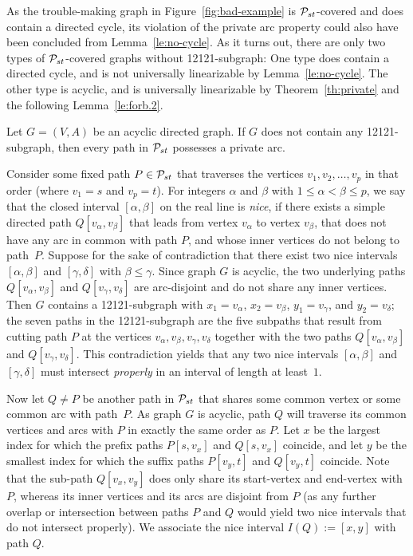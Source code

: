 As the trouble-making graph in Figure~\ref{fig:bad-example} is ${\cal P}_{st}$-covered and 
does contain a directed cycle, its violation of the private arc property could also have 
been concluded from Lemma~\ref{le:no-cycle}.
As it turns out, there are only two types of ${\cal P}_{st}$-covered graphs without 12121-subgraph:
One type does contain a directed cycle, and is not universally linearizable by Lemma~\ref{le:no-cycle}.
The other type is acyclic, and is universally linearizable by Theorem~\ref{th:private} and 
the following Lemma~\ref{le:forb.2}.
\begin{lemma}
\label{le:forb.2}
Let $G=(V,A)$ be an acyclic directed graph.
If $G$ does not contain any 12121-subgraph,
then every path in ${\cal P}_{st}$ possesses a private arc.
\end{lemma}
\proof
Consider some fixed path $P\in{\cal P}_{st}$ that traverses the vertices $v_1,v_2,\ldots,v_p$ in 
that order (where $v_1=s$ and $v_p=t$).
For integers $\alpha$ and $\beta$ with $1\le\alpha<\beta\le p$, we say that the closed interval 
$[\alpha,\beta]$ on the real line is \emph{nice}, if there exists a simple directed path 
$Q[v_{\alpha},v_{\beta}]$ that leads from vertex $v_{\alpha}$ to vertex $v_{\beta}$, that does 
not have any arc in common with path $P$, and whose inner vertices do not belong to path~$P$.
Suppose for the sake of contradiction that there exist two nice intervals $[\alpha,\beta]$ and $[\gamma,\delta]$ 
with $\beta\le\gamma$.
Since graph $G$ is acyclic, the two underlying paths $Q[v_{\alpha},v_{\beta}]$ and $Q[v_{\gamma},v_{\delta}]$ 
are arc-disjoint and do not share any inner vertices.
Then $G$ contains a 12121-subgraph with $x_1=v_{\alpha}$, $x_2=v_{\beta}$, $y_1=v_{\gamma}$, and $y_2=v_{\delta}$;
the seven paths in the 12121-subgraph are the five subpaths that result from cutting path $P$ 
at the vertices $v_{\alpha},v_{\beta},v_{\gamma},v_{\delta}$ together with the two paths 
$Q[v_{\alpha},v_{\beta}]$ and $Q[v_{\gamma},v_{\delta}]$.
This contradiction yields that any two nice intervals $[\alpha,\beta]$ and $[\gamma,\delta]$ 
must intersect \emph{properly} in an interval of length at least~$1$.

Now let $Q\ne P$ be another path in ${\cal P}_{st}$ that shares some common vertex or some common arc with path~$P$. 
As graph $G$ is acyclic, path $Q$ will traverse its common vertices and arcs with $P$ in exactly 
the same order as $P$.
Let $x$ be the largest  index for which the prefix paths $P[s,v_x]$ and $Q[s,v_x]$ coincide, and
let $y$ be the smallest index for which the suffix paths $P[v_y,t]$ and $Q[v_y,t]$ coincide.
Note that the sub-path $Q[v_x,v_y]$ does only share its start-vertex and end-vertex with $P$, 
whereas its inner vertices and its arcs are disjoint from $P$ (as any further overlap or intersection 
between paths $P$ and $Q$ would yield two nice intervals that do not intersect properly).
We associate the nice interval $I(Q):=[x,y]$ with path $Q$.


